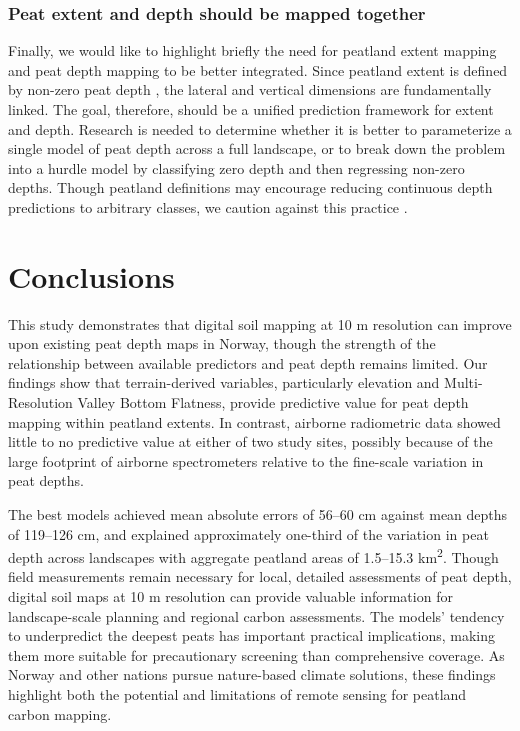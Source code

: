 \documentclass[soil, manuscript]{copernicus}
\begin{document}
\subsubsection{Peat extent and depth should be mapped together}

Finally, we would like to highlight briefly the need for peatland extent mapping and peat depth mapping to be better integrated.
Since peatland extent is defined by non-zero peat depth \citep[the specific threshold varies by definition,][]{minasnyMappingMonitoringPeatland2024}, the lateral and vertical dimensions are fundamentally linked.
The goal, therefore, should be a unified prediction framework for extent and depth.
Research is needed to determine whether it is better to parameterize a single model of peat depth across a full landscape, or to break down the problem into a hurdle model by classifying zero depth and then regressing non-zero depths.
Though peatland definitions may encourage reducing continuous depth predictions to arbitrary classes, we caution against this practice \citep[as in][]{ivanovsModelingGeospatialDistribution2024, karjalainenComparisonTwoGammaray2025}.

\section{Conclusions}

This study demonstrates that digital soil mapping at 10 m resolution can improve upon existing peat depth maps in Norway, though the strength of the relationship between available predictors and peat depth remains limited.
Our findings show that terrain-derived variables, particularly elevation and Multi-Resolution Valley Bottom Flatness, provide predictive value for peat depth mapping within peatland extents.
In contrast, airborne radiometric data showed little to no predictive value at either of two study sites, possibly because of the large footprint of airborne spectrometers relative to the fine-scale variation in peat depths.

The best models achieved mean absolute errors of 56--60 cm against mean depths of 119--126 cm, and explained approximately one-third of the variation in peat depth across landscapes with aggregate peatland areas of 1.5--15.3 km\textsuperscript{2}.
Though field measurements remain necessary for local, detailed assessments of peat depth, digital soil maps at 10 m resolution can provide valuable information for landscape-scale planning and regional carbon assessments.
The models' tendency to underpredict the deepest peats has important practical implications, making them more suitable for precautionary screening than comprehensive coverage.
As Norway and other nations pursue nature-based climate solutions, these findings highlight both the potential and limitations of remote sensing for peatland carbon mapping.
\end{document}
